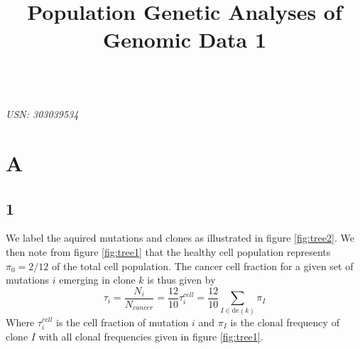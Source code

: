 \documentclass{article}
\title{Population Genetic Analyses of Genomic Data 1}
\begin{document}

\begin{center}
\textbf{\LARGE{}}\\

\textit{USN: 303039534}\\
\end{center}

\section*{A}

\subsection*{1}

We label the aquired mutations and clones as illustrated in figure \ref{fig:tree2}. We then note from figure \ref{fig:tree1} that the healthy cell population represents $\pi_0 = 2/12$ of the total cell population. The cancer cell fraction for a given set of mutations $i$ emerging in clone $k$ is thus given by 
\begin{equation}
\tau_i = \dfrac{N_i}{N_{cancer}} = \dfrac{12}{10} \tau_i^{cell}   = \dfrac{12}{10} \sum_{I \in \text{de}(k)}{\pi_I}
\end{equation}
Where $\tau_i^{cell}$ is the cell fraction of mutation $i$ and $\pi_I$ is the clonal frequency of clone $I$ with all clonal frequencies given in figure \ref{fig:tree1}.
\end{document}
